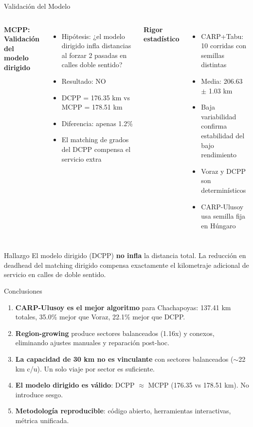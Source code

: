 \documentclass[11pt,aspectratio=169]{beamer}
\begin{document}
\begin{frame}{Validación del Modelo}
\begin{columns}[T]
\textbf{MCPP: Validación del modelo dirigido}
\begin{itemize}
  \item Hipótesis: ¿el modelo dirigido infla distancias al forzar 2 pasadas en calles doble sentido?
  \item Resultado: NO
  \item DCPP = 176.35 km vs MCPP = 178.51 km
  \item Diferencia: apenas 1.2\%
  \item El matching de grados del DCPP compensa el servicio extra
\end{itemize}

\textbf{Rigor estadístico}
\begin{itemize}
  \item CARP+Tabu: 10 corridas con semillas distintas
  \item Media: 206.63 $\pm$ 1.03 km
  \item Baja variabilidad confirma estabilidad del bajo rendimiento
  \item Voraz y DCPP son determinísticos
  \item CARP-Ulusoy usa semilla fija en Húngaro
\end{itemize}
\end{columns}

\vspace{12pt}
\begin{block}{Hallazgo}
El modelo dirigido (DCPP) \textbf{no infla} la distancia total. La reducción en deadhead del matching dirigido compensa exactamente el kilometraje adicional de servicio en calles de doble sentido.
\end{block}
\end{frame}

\begin{frame}{Conclusiones}
\begin{enumerate}
  \item \textbf{CARP-Ulusoy es el mejor algoritmo} para Chachapoyas: 137.41 km totales, 35.0\% mejor que Voraz, 22.1\% mejor que DCPP.
  \bigskip
  \item \textbf{Region-growing} produce sectores balanceados (1.16x) y conexos, eliminando ajustes manuales y reparación post-hoc.
  \bigskip
  \item \textbf{La capacidad de 30 km no es vinculante} con sectores balanceados ($\sim$22 km c/u). Un solo viaje por sector es suficiente.
  \bigskip
  \item \textbf{El modelo dirigido es válido}: DCPP $\approx$ MCPP (176.35 vs 178.51 km). No introduce sesgo.
  \bigskip
  \item \textbf{Metodología reproducible}: código abierto, herramientas interactivas, métrica unificada.
\end{enumerate}
\end{frame}
\end{document}
